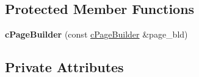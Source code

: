 \subsection*{\-Protected \-Member \-Functions}
\begin{DoxyCompactItemize}
\item 
\hypertarget{classhttp__server_1_1cPageBuilder_a3f3d04425b2f912c5616362b9be5d19e}{{\bfseries c\-Page\-Builder} (const \hyperlink{classhttp__server_1_1cPageBuilder}{c\-Page\-Builder} \&page\-\_\-bld)}\label{classhttp__server_1_1cPageBuilder_a3f3d04425b2f912c5616362b9be5d19e}

\end{DoxyCompactItemize}
\subsection*{\-Private \-Attributes}
